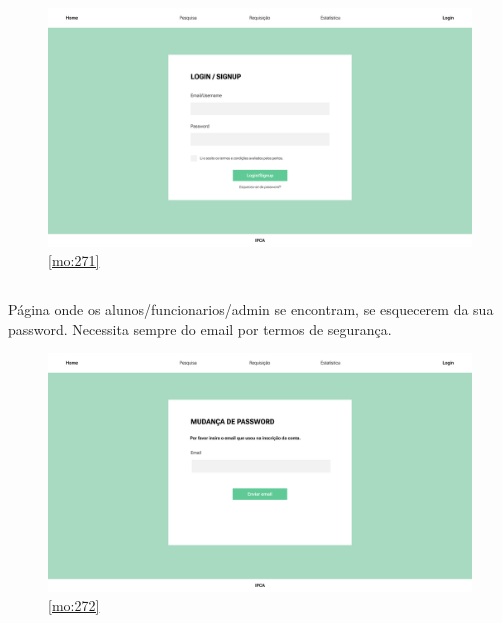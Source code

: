 \begin{figure}[H]
	\centering
	\includegraphics[width=1\linewidth]{../Mockups/PNGs/Login - Signup.png}  %
	\caption{\ref{mo:271}}
	\label{fig:chap271}
\end{figure}


\newpage 

\subsection{}

Página onde os alunos/funcionarios/admin se encontram, se esquecerem da sua password. Necessita sempre do email por termos de segurança.

\begin{figure}[H]
	\centering
	\includegraphics[width=1\linewidth]{../Mockups/PNGs/Login - Password.png}  %
	\caption{\ref{mo:272}}
	\label{fig:chap272}
\end{figure}


\newpage

\subsection{}

